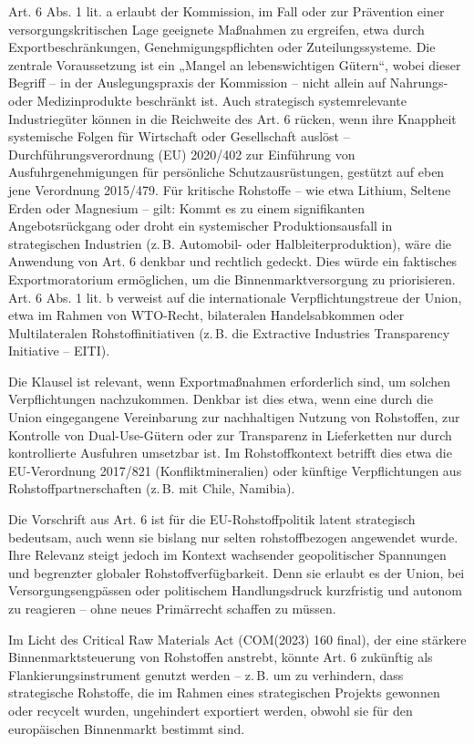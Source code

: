 \documentclass[12pt,a4paper,oneside]{book} %
\begin{document}
Art. 6 Abs. 1 lit. a erlaubt der Kommission, im Fall oder zur Prävention einer versorgungskritischen Lage geeignete Maßnahmen zu ergreifen, etwa durch Exportbeschränkungen, Genehmigungspflichten oder Zuteilungssysteme. Die zentrale Voraussetzung ist ein „Mangel an lebenswichtigen Gütern“, wobei dieser Begriff – in der Auslegungspraxis der Kommission – nicht allein auf Nahrungs- oder Medizinprodukte beschränkt ist. Auch strategisch systemrelevante Industriegüter können in die Reichweite des Art. 6 rücken, wenn ihre Knappheit systemische Folgen für Wirtschaft oder Gesellschaft auslöst --  Durchführungsverordnung (EU) 2020/402 zur Einführung von Ausfuhrgenehmigungen für persönliche Schutzausrüstungen, gestützt auf eben jene Verordnung 2015/479. Für kritische Rohstoffe – wie etwa Lithium, Seltene Erden oder Magnesium – gilt: Kommt es zu einem signifikanten Angebotsrückgang oder droht ein systemischer Produktionsausfall in strategischen Industrien (z. B. Automobil- oder Halbleiterproduktion), wäre die Anwendung von Art. 6 denkbar und rechtlich gedeckt. Dies würde ein faktisches Exportmoratorium ermöglichen, um die Binnenmarktversorgung zu priorisieren. Art. 6 Abs. 1 lit. b verweist auf die internationale Verpflichtungstreue der Union, etwa im Rahmen von WTO-Recht, bilateralen Handelsabkommen oder Multilateralen Rohstoffinitiativen (z. B. die Extractive Industries Transparency Initiative – EITI).

Die Klausel ist relevant, wenn Exportmaßnahmen erforderlich sind, um solchen Verpflichtungen nachzukommen. Denkbar ist dies etwa, wenn eine durch die Union eingegangene Vereinbarung zur nachhaltigen Nutzung von Rohstoffen, zur Kontrolle von Dual-Use-Gütern oder zur Transparenz in Lieferketten nur durch kontrollierte Ausfuhren umsetzbar ist. Im Rohstoffkontext betrifft dies etwa die EU-Verordnung 2017/821 (Konfliktmineralien) oder künftige Verpflichtungen aus Rohstoffpartnerschaften (z. B. mit Chile, Namibia). 

Die Vorschrift aus Art. 6 ist für die EU-Rohstoffpolitik latent strategisch bedeutsam, auch wenn sie bislang nur selten rohstoffbezogen angewendet wurde. Ihre Relevanz steigt jedoch im Kontext wachsender geopolitischer Spannungen und begrenzter globaler Rohstoffverfügbarkeit. Denn sie erlaubt es der Union, bei Versorgungsengpässen oder politischem Handlungsdruck kurzfristig und autonom zu reagieren – ohne neues Primärrecht schaffen zu müssen.

Im Licht des Critical Raw Materials Act (COM(2023) 160 final), der eine stärkere Binnenmarktsteuerung von Rohstoffen anstrebt, könnte Art. 6 zukünftig als Flankierungsinstrument genutzt werden -- z. B. um zu verhindern, dass strategische Rohstoffe, die im Rahmen eines strategischen Projekts gewonnen oder recycelt wurden, ungehindert exportiert werden, obwohl sie für den europäischen Binnenmarkt bestimmt sind.
\end{document}
